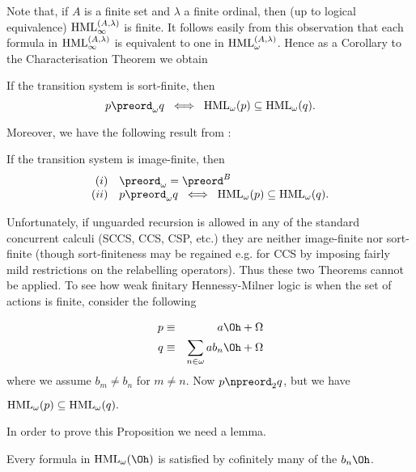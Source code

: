 Note that, if $A$ is a finite set and $\lambda$ a finite ordinal, then (up to logical equivalence) ${\rm HML}^{(A, \lambda )}_{\infty}$ is finite. 
It follows easily from this observation that each formula in ${\rm HML}^{(A, \lambda )}_{\infty}$ is equivalent to one in ${\rm HML}^{(A, \lambda )}_{\omega}$. 
Hence as a Corollary to the Characterisation Theorem we obtain
\begin{theorem}
\cite{Abr87b} If the transition system is sort-finite, then
\[ p \preord_{\omega} q \;\; \Longleftrightarrow \;\; {\rm HML}_{\omega}(p) \subseteq {\rm HML}_{\omega}(q) . \]
\end{theorem}

Moreover, we have the following result from \cite{HM85}:
\begin{theorem}
If the transition system is image-finite, then
\[ \begin{array}{rl}
(i) & {\preord_{\omega}} = {\preord^{B}} \\
(ii) & p \preord_{\omega} q \;\; \Longleftrightarrow \;\; {\rm HML}_{\omega}(p) \subseteq {\rm HML}_{\omega}(q) . 
\end{array} \]
\end{theorem}

Unfortunately, if unguarded recursion is allowed in any of the standard concurrent calculi (SCCS, CCS, CSP, etc.) 
they are neither image-finite nor sort-finite (though sort-finiteness may be regained e.g. for CCS by imposing fairly mild restrictions on the relabelling operators). 
Thus these two Theorems cannot be applied. 
To see how weak finitary Hennessy-Milner logic is when the set of actions is finite, consider the following

\begin{eqnarray*}
p & \equiv & a \Oh + \Omega \\
q & \equiv & \sum_{n \in \omega} a b_{n} \Oh + \Omega
\end{eqnarray*}
where we assume $b_{m} \not= b_{n}$ for $m \not= n$. Now $p \npreord_{2} q$, but we have

\begin{proposition}
\label{bex}
${\rm HML}_{\omega}(p) \subseteq {\rm HML}_{\omega}(q).$
\end{proposition}

In order to prove this Proposition we need a lemma.

\begin{lemma}
Every formula in ${\rm HML}_{\omega}(\Oh )$ is satisfied by cofinitely many of the $b_{n}\Oh$.
\end{lemma}

